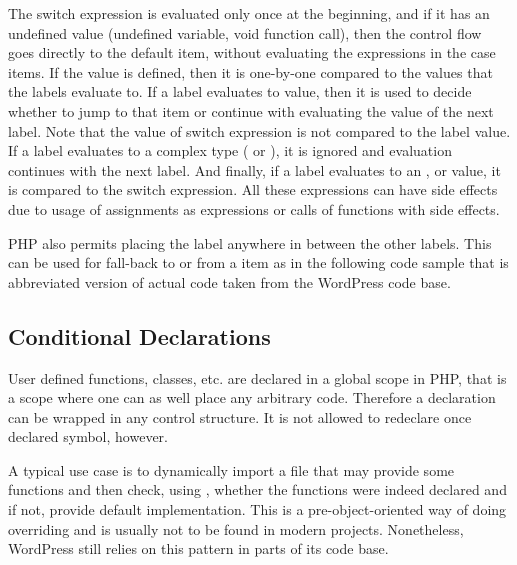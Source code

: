     The switch expression is evaluated only once 
    at the beginning, and if it has an undefined value (undefined variable, 
    void function call), then the control flow goes directly 
    to the default item, without evaluating the expressions 
    in the case items. If the value is defined, then it is 
    one-by-one compared to the values that the 
     labels evaluate to. If a  label evaluates 
    to  value, then it is used to decide whether to 
    jump to that  item or continue with evaluating 
    the value of the next  label. Note that the value of 
    switch expression is not compared to the  label value. 
    If a  label evaluates to a complex type ( or ), 
    it is ignored and evaluation continues with the next  label. 
    And finally, if a  label evaluates to an 
    ,  or  value, it is 
    compared to the switch expression. All these expressions can 
    have side effects due to usage of assignments as expressions 
    or calls of functions with side effects. 
    
    PHP also permits placing the  label anywhere in between 
    the other  labels. This can be used for fall-back 
    to or from a  item as in the following code sample 
    that is abbreviated version of actual code taken from the 
    WordPress\cite{wordpress} code base.
    
    
    
    \subsection{Conditional Declarations}
    User defined functions, classes, etc. are declared in 
    a global scope in PHP, that is a scope where one can 
    as well place any arbitrary code. Therefore a declaration 
    can be wrapped in any control structure. 
    It is not allowed to redeclare once declared symbol, however.
    
    A typical use case is to dynamically import a file 
    that may provide some functions and then check, 
    using , whether the functions were 
    indeed declared and if not, provide default implementation.
    This is a pre-object-oriented way of doing overriding and 
    is usually not to be found in modern projects. Nonetheless, 
    WordPress still relies on this pattern in parts of its code base.
    
